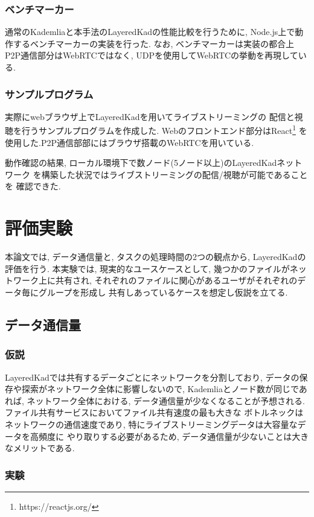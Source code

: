 \documentclass[sotsuron]{jcsie}
\begin{document}
\subsection{ベンチマーカー}
通常のKademliaと本手法のLayeredKadの性能比較を行うために, 
Node.js上で動作するベンチマーカーの実装を行った.
なお, ベンチマーカーは実装の都合上P2P通信部分はWebRTCではなく, 
UDPを使用してWebRTCの挙動を再現している.

\subsection{サンプルプログラム}
実際にwebブラウザ上でLayeredKadを用いてライブストリーミングの
配信と視聴を行うサンプルプログラムを作成した.
Webのフロントエンド部分はReact\footnote{https://reactjs.org/}
を使用した.P2P通信部部にはブラウザ搭載のWebRTCを用いている.

動作確認の結果, ローカル環境下で数ノード(5ノード以上)のLayeredKadネットワーク
を構築した状況ではライブストリーミングの配信/視聴が可能であることを
確認できた.

\chapter{評価実験}
本論文では, データ通信量と, タスクの処理時間の2つの観点から, 
LayeredKadの評価を行う.
本実験では, 現実的なユースケースとして, 
幾つかのファイルがネットワーク上に共有され, 
それぞれのファイルに関心があるユーザがそれぞれのデータ毎にグループを形成し
共有しあっているケースを想定し仮説を立てる.

\section{データ通信量}
\subsection{仮説}
LayeredKadでは共有するデータごとにネットワークを分割しており, 
データの保存や探索がネットワーク全体に影響しないので, 
Kademliaとノード数が同じであれば, ネットワーク全体における, 
データ通信量が少なくなることが予想される.
ファイル共有サービスにおいてファイル共有速度の最も大きな
ボトルネックはネットワークの通信速度であり, 
特にライブストリーミングデータは大容量なデータを高頻度に
やり取りする必要があるため, 
データ通信量が少ないことは大きなメリットである.

\subsection{実験}
\end{document}
